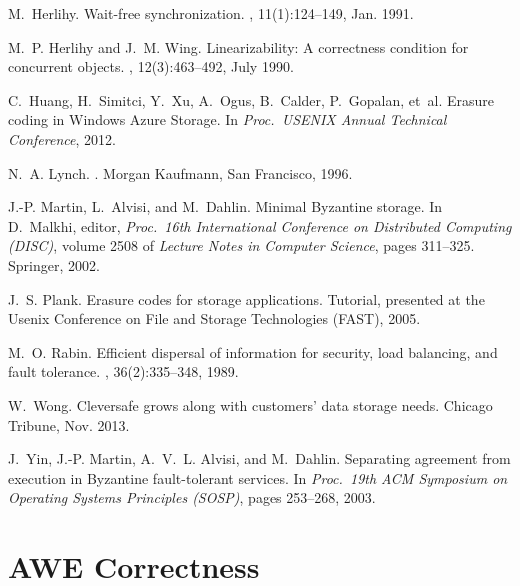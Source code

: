 \documentclass[oribibl]{llncs}
\theoremstyle{definition-boldhead}
\newcommand{\NAME}{AWE\xspace}
\begin{document}
\begin{thebibliography}{10}
M.~Herlihy.
\newblock Wait-free synchronization.
,
  11(1):124--149, Jan. 1991.

M.~P. Herlihy and J.~M. Wing.
\newblock Linearizability: A correctness condition for concurrent objects.
,
  12(3):463--492, July 1990.

C.~Huang, H.~Simitci, Y.~Xu, A.~Ogus, B.~Calder, P.~Gopalan, et~al.
\newblock Erasure coding in {Windows} {Azure} {Storage}.
\newblock In {\em Proc.\ {USENIX} Annual Technical Conference}, 2012.

N.~A. Lynch.
.
\newblock Morgan Kaufmann, San Francisco, 1996.

J.-P. Martin, L.~Alvisi, and M.~Dahlin.
\newblock Minimal {Byzantine} storage.
\newblock In D.~Malkhi, editor, {\em Proc.\ 16th International Conference on
  Distributed Computing (DISC)}, volume 2508 of {\em Lecture Notes in Computer
  Science}, pages 311--325. Springer, 2002.

J.~S. Plank.
\newblock Erasure codes for storage applications.
\newblock Tutorial, presented at the Usenix Conference on File and Storage
  Technologies (FAST), 2005.

M.~O. Rabin.
\newblock Efficient dispersal of information for security, load balancing, and
  fault tolerance.
, 36(2):335--348, 1989.

W.~Wong.
\newblock Cleversafe grows along with customers' data storage needs.
\newblock Chicago Tribune, Nov. 2013.

J.~Yin, J.-P. Martin, A.~V.~L. Alvisi, and M.~Dahlin.
\newblock Separating agreement from execution in {Byzantine} fault-tolerant
  services.
\newblock In {\em Proc.\ 19th ACM Symposium on Operating Systems Principles
  (SOSP)}, pages 253--268, 2003.

\end{thebibliography}



\if\submit\yes
\newpage
\appendix
\section{\NAME Correctness}
\label{app}

\fi
\end{document}
